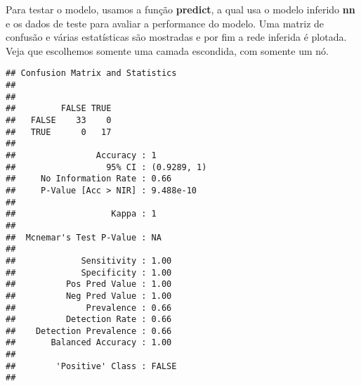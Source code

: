 \documentclass[
]{article}
\newenvironment{Shaded}{\begin{snugshade}}{\end{snugshade}}
\newcommand{\AttributeTok}[1]{\textcolor[rgb]{0.77,0.63,0.00}{#1}}
\newcommand{\ConstantTok}[1]{\textcolor[rgb]{0.00,0.00,0.00}{#1}}
\newcommand{\DecValTok}[1]{\textcolor[rgb]{0.00,0.00,0.81}{#1}}
\newcommand{\FloatTok}[1]{\textcolor[rgb]{0.00,0.00,0.81}{#1}}
\newcommand{\FunctionTok}[1]{\textcolor[rgb]{0.00,0.00,0.00}{#1}}
\newcommand{\NormalTok}[1]{#1}
\newcommand{\OtherTok}[1]{\textcolor[rgb]{0.56,0.35,0.01}{#1}}
\newcommand{\SpecialCharTok}[1]{\textcolor[rgb]{0.00,0.00,0.00}{#1}}
\newcommand{\StringTok}[1]{\textcolor[rgb]{0.31,0.60,0.02}{#1}}
\begin{document}
Para testar o modelo, usamos a função \textbf{predict}, a qual usa o
modelo inferido \textbf{nn} e os dados de teste para avaliar a
performance do modelo. Uma matriz de confusão e várias estatísticas são
mostradas e por fim a rede inferida é plotada. Veja que escolhemos
somente uma camada escondida, com somente um nó.

\begin{Shaded}
\end{Shaded}

\begin{verbatim}
## Confusion Matrix and Statistics
## 
##        
##         FALSE TRUE
##   FALSE    33    0
##   TRUE      0   17
##                                      
##                Accuracy : 1          
##                  95% CI : (0.9289, 1)
##     No Information Rate : 0.66       
##     P-Value [Acc > NIR] : 9.488e-10  
##                                      
##                   Kappa : 1          
##                                      
##  Mcnemar's Test P-Value : NA         
##                                      
##             Sensitivity : 1.00       
##             Specificity : 1.00       
##          Pos Pred Value : 1.00       
##          Neg Pred Value : 1.00       
##              Prevalence : 0.66       
##          Detection Rate : 0.66       
##    Detection Prevalence : 0.66       
##       Balanced Accuracy : 1.00       
##                                      
##        'Positive' Class : FALSE      
## 
\end{verbatim}
\end{document}

